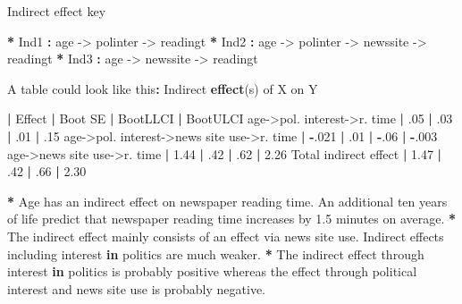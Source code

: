 \documentclass[a4paper]{book}
\newenvironment{Shaded}{\begin{snugshade}}{\end{snugshade}}
\newcommand{\KeywordTok}[1]{\textcolor[rgb]{0,0,0}{\textbf{#1}}}
\newcommand{\DecValTok}[1]{\textcolor[rgb]{0.00,0.00,0.00}{#1}}
\newcommand{\FloatTok}[1]{\textcolor[rgb]{0.00,0.00,0.00}{#1}}
\newcommand{\StringTok}[1]{\textcolor[rgb]{0.00,0.00,0.00}{#1}}
\newcommand{\ControlFlowTok}[1]{\textcolor[rgb]{0.00,0.00,0.00}{\textbf{#1}}}
\newcommand{\OperatorTok}[1]{\textcolor[rgb]{0.00,0.00,0.00}{\textbf{#1}}}
\newcommand{\NormalTok}[1]{#1}
\theoremstyle{definition}
\theoremstyle{definition}
\theoremstyle{definition}
\theoremstyle{remark}
\begin{document}
\begin{Shaded}
\begin{Highlighting}[]
\NormalTok{Indirect effect key   }
  
\OperatorTok{*}\StringTok{ }\NormalTok{Ind1 }\OperatorTok{:}\StringTok{   }\NormalTok{age ->}\StringTok{ }\NormalTok{polinter ->}\StringTok{ }\NormalTok{readingt   }
\OperatorTok{*}\StringTok{ }\NormalTok{Ind2 }\OperatorTok{:}\StringTok{   }\NormalTok{age ->}\StringTok{ }\NormalTok{polinter ->}\StringTok{ }\NormalTok{newssite ->}\StringTok{ }\NormalTok{readingt   }
\OperatorTok{*}\StringTok{ }\NormalTok{Ind3 }\OperatorTok{:}\StringTok{   }\NormalTok{age ->}\StringTok{ }\NormalTok{newssite ->}\StringTok{ }\NormalTok{readingt   }
  
\NormalTok{A table could look like this}\OperatorTok{:}\StringTok{  }
\StringTok{    }
\NormalTok{Indirect }\KeywordTok{effect}\NormalTok{(s) of X on Y   }
  
                                           \OperatorTok{|}\StringTok{  }\NormalTok{Effect }\OperatorTok{|}\StringTok{ }\NormalTok{Boot SE }\OperatorTok{|}\StringTok{ }\NormalTok{BootLLCI }\OperatorTok{|}\StringTok{ }\NormalTok{BootULCI  }
\NormalTok{age->pol. interest->r. time                }\OperatorTok{|}\StringTok{  }\NormalTok{.}\DecValTok{05}    \OperatorTok{|}\StringTok{  }\NormalTok{.}\DecValTok{03}    \OperatorTok{|}\StringTok{  }\NormalTok{.}\DecValTok{01}     \OperatorTok{|}\StringTok{  }\NormalTok{.}\DecValTok{15}  
\NormalTok{age->pol. interest->news site use->r. time }\OperatorTok{|}\StringTok{  }\OperatorTok{-}\NormalTok{.}\DecValTok{021}  \OperatorTok{|}\StringTok{  }\NormalTok{.}\DecValTok{01}    \OperatorTok{|}\StringTok{  }\OperatorTok{-}\NormalTok{.}\DecValTok{06}    \OperatorTok{|}\StringTok{  }\OperatorTok{-}\NormalTok{.}\DecValTok{003}  
\NormalTok{age->news site use->r. time                }\OperatorTok{|}\StringTok{  }\FloatTok{1.44}   \OperatorTok{|}\StringTok{  }\NormalTok{.}\DecValTok{42}    \OperatorTok{|}\StringTok{  }\NormalTok{.}\DecValTok{62}     \OperatorTok{|}\StringTok{  }\FloatTok{2.26}  
\NormalTok{Total indirect effect                      }\OperatorTok{|}\StringTok{  }\FloatTok{1.47}   \OperatorTok{|}\StringTok{  }\NormalTok{.}\DecValTok{42}    \OperatorTok{|}\StringTok{  }\NormalTok{.}\DecValTok{66}     \OperatorTok{|}\StringTok{  }\FloatTok{2.30}  
  
  
\OperatorTok{*}\StringTok{ }\NormalTok{Age has an indirect effect on newspaper reading time. An additional ten}
\NormalTok{years of life predict that newspaper reading time increases by }\FloatTok{1.5}\NormalTok{ minutes on}
\NormalTok{average.}
\OperatorTok{*}\StringTok{ }\NormalTok{The indirect effect mainly consists of an effect via news site use. Indirect}
\NormalTok{effects including interest }\ControlFlowTok{in}\NormalTok{ politics are much weaker.}
\OperatorTok{*}\StringTok{ }\NormalTok{The indirect effect through interest }\ControlFlowTok{in}\NormalTok{ politics is probably positive}
\NormalTok{whereas the effect through political interest and news site use is probably}
\NormalTok{negative.}
\end{Highlighting}
\end{Shaded}
\end{document}
